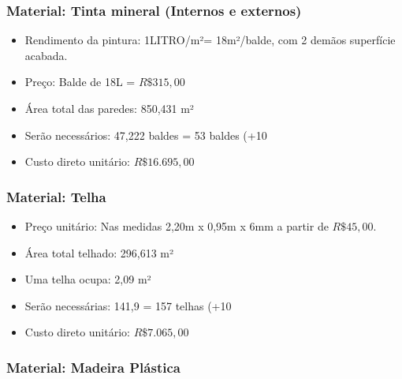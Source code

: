 \subsubsection*{\textbf{Material: Tinta mineral (Internos e externos)}}


\begin{itemize}

		\item Rendimento da pintura: 1LITRO/m²= 18m²/balde, com 2 demãos superfície acabada.

		\item Preço: Balde de 18L = $R\$ 315,00$

		\item Área total das paredes: 850,431 m²

		\item Serão necessários: 47,222 baldes = 53 baldes (+10%

		\item Custo direto unitário: $R\$ 16.695,00$


\end{itemize}

\subsubsection*{\textbf{Material: Telha}}


\begin{itemize}

		\item Preço unitário: Nas medidas 2,20m x 0,95m x 6mm a partir de $R\$ 45,00$.

		\item Área total telhado: 296,613 m²

		\item Uma telha ocupa: 2,09 m²

		\item Serão necessárias: 141,9 = 157 telhas (+10%

		\item Custo direto unitário: $R\$7.065,00$

\end{itemize}

\subsubsection*{\textbf{Material: Madeira Plástica}}


